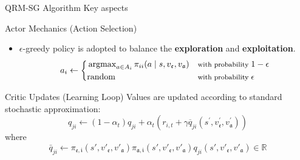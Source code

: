 \documentclass[10pt, aspectratio=169]{beamer}
\newcommand{\evidenzia}[1]{\textcolor{verdeSalvia}{\textbf{#1}}}
\begin{document}
\begin{frame}{QRM-SG Algorithm Key aspects}
    \begin{block}{Actor Mechanics (Action Selection)}
        \begin{itemize}
            \item $\epsilon$-greedy policy is adopted to balance the \evidenzia{exploration} and \evidenzia{exploitation}.
            {
            $$a_i \leftarrow 
            \left\{
                \begin{aligned}
                &\operatorname{argmax}_{a\in A_i} \pi_{ii}(a \mid s, v_\mathfrak{e}, v_\mathfrak{a}) && {\footnotesize\text{with probability } 1-\epsilon} \\
                &\text{random} && {\footnotesize\text{with probability } \epsilon}\\
            \end{aligned}
            \right.
            $$
            }
        \end{itemize}
    \end{block}
    \vspace{0.2cm}
    
    \begin{block}{Critic Updates (Learning Loop)}
        Values are updated according to standard stochastic approximation:
        \[ q_{ji} \leftarrow (1-\alpha_{t})q_{ji} + \alpha_{t}(r_{i,t} + \gamma \overline{q}_{ji}(s^{\prime}, v_{\mathfrak{e}}^{\prime}, v_{\mathfrak{a}}^{\prime})) \]
        where %
        \[ \bar q_{ji} \leftarrow \pi_{\mathfrak{e},\mathfrak{i}}(s', v'_\mathfrak{e}, v'_\mathfrak{a} )  \pi_{\mathfrak{a},\mathfrak{i}}(s', v'_\mathfrak{e}, v'_\mathfrak{a} )  q_{ji} (s', v'_\mathfrak{e}, v'_\mathfrak{a} ) \in \mathbb{R}\]
    \end{block}
\end{frame}
\end{document}
